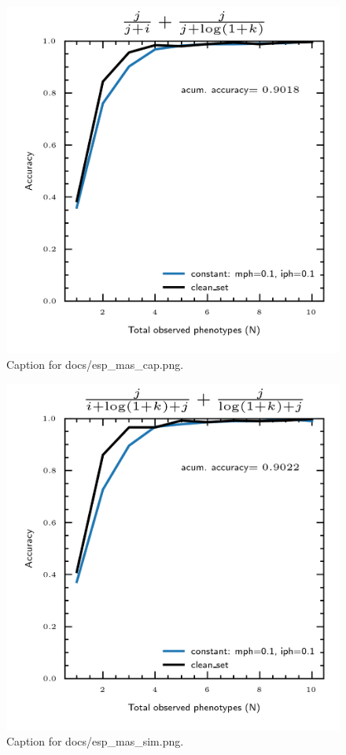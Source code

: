 \documentclass{article}
\begin{document}
\begin{figure}[h] \centering \includegraphics{docs/esp_mas_cap.png} \caption{Caption for docs/esp_mas_cap.png.} \end{figure}
\begin{figure}[h] \centering \includegraphics{docs/esp_mas_sim.png} \caption{Caption for docs/esp_mas_sim.png.} \end{figure}
\end{document}
